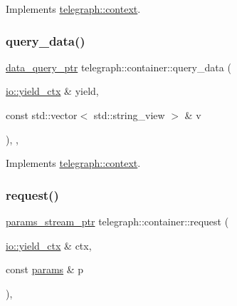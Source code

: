 Implements \hyperlink{classtelegraph_1_1context_a301114c9b73194507ae58221566a3e57}{telegraph\+::context}.

\mbox{\label{classtelegraph_1_1container_aca8b0b22be3cde48f0bc5f3fa79b29da}} 
\subsubsection{\texorpdfstring{query\+\_\+data()}{query\_data()}\hspace{0.1cm}{\footnotesize\ttfamily [2/2]}}
{\footnotesize\ttfamily \hyperlink{namespacetelegraph_a6ffe775ac48dca2a4013b53d692199c8}{data\+\_\+query\+\_\+ptr} telegraph\+::container\+::query\+\_\+data (\begin{DoxyParamCaption}\item[{\hyperlink{structboost_1_1asio_1_1yield__ctx}{io\+::yield\+\_\+ctx} \&}]{yield,  }\item[{const std\+::vector$<$ std\+::string\+\_\+view $>$ \&}]{v }\end{DoxyParamCaption})\hspace{0.3cm}{\ttfamily [inline]}, {\ttfamily [override]}, {\ttfamily [virtual]}}



Implements \hyperlink{classtelegraph_1_1context_a34793623d2a2def580ad0b8710c74c6d}{telegraph\+::context}.

\mbox{\label{classtelegraph_1_1container_ade9ce299ee72554a84c1a71f0ad37915}} 
\subsubsection{\texorpdfstring{request()}{request()}}
{\footnotesize\ttfamily \hyperlink{namespacetelegraph_ad071241508ea0f86c7de0686016f9ca9}{params\+\_\+stream\+\_\+ptr} telegraph\+::container\+::request (\begin{DoxyParamCaption}\item[{\hyperlink{structboost_1_1asio_1_1yield__ctx}{io\+::yield\+\_\+ctx} \&}]{ctx,  }\item[{const \hyperlink{classtelegraph_1_1params}{params} \&}]{p }\end{DoxyParamCaption})\hspace{0.3cm}{\ttfamily [override]}, {\ttfamily [virtual]}}



